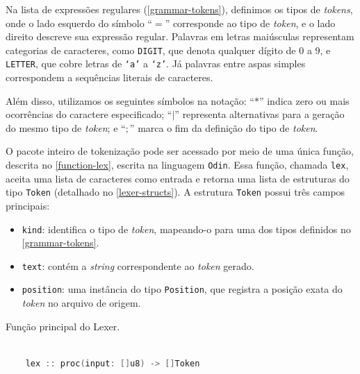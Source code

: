 
Na lista de expressões regulares (\autoref{grammar-tokens}), definimos os tipos de \textit{tokens}, onde o lado esquerdo do símbolo ``$=$'' corresponde ao tipo de \textit{token}, e o lado direito descreve sua expressão regular. Palavras em letras maiúsculas representam categorias de caracteres, como \texttt{DIGIT}, que denota qualquer dígito de 0 a 9, e \texttt{LETTER}, que cobre letras de \texttt{`a'} a \texttt{`z'}. Já palavras entre aspas simples correspondem a sequências literais de caracteres.

Além disso, utilizamos os seguintes símbolos na notação: ``$*$'' indica zero ou mais ocorrências do caractere especificado; ``$|$'' representa alternativas para a geração do mesmo tipo de \textit{token}; e ``$;$'' marca o fim da definição do tipo de \textit{token}.


O pacote inteiro de tokenização pode ser acessado por meio de uma única função, descrita no \autoref{function-lex}, escrita na linguagem \texttt{Odin}. Essa função, chamada \texttt{lex}, aceita uma lista de caracteres como entrada e retorna uma lista de estruturas do tipo \texttt{Token} (detalhado no \autoref{lexer-structs}). A estrutura \texttt{Token} possui três campos principais:

\begin{itemize}
    \item \texttt{kind}: identifica o tipo de \textit{token}, mapeando-o para uma dos tipos definidos no \autoref{grammar-tokens}.
    \item \texttt{text}: contém a \textit{string} correspondente ao \textit{token} gerado.
    \item \texttt{position}: uma instância do tipo \texttt{Position}, que registra a posição exata do \textit{token} no arquivo de origem.
\end{itemize}


\begin{codigo}[H]
        \caption{\small Função principal do Lexer. }
        \label{function-lex}
\begin{lstlisting}[language = c]
  
    lex :: proc(input: []u8) -> []Token
\end{lstlisting}
\end{codigo}



